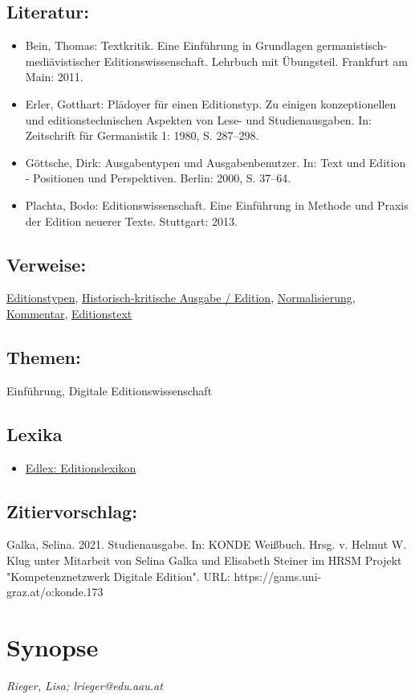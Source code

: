 \documentclass{article}
\begin{document}
        \subsection*{Literatur:}\begin{itemize}\item Bein, Thomas: Textkritik. Eine Einführung in Grundlagen germanistisch-mediävistischer Editionswissenschaft. Lehrbuch mit Übungsteil. Frankfurt am Main: 2011.\item Erler, Gotthart: Plädoyer für einen Editionstyp. Zu einigen konzeptionellen und editionstechnischen Aspekten von Lese- und Studienausgaben. In: Zeitschrift für Germanistik 1: 1980, S. 287–298.\item Göttsche, Dirk: Ausgabentypen und Ausgabenbenutzer. In: Text und Edition - Positionen und Perspektiven. Berlin: 2000, S. 37–64.\item Plachta, Bodo: Editionswissenschaft. Eine Einführung in Methode und Praxis der Edition neuerer Texte. Stuttgart: 2013.\end{itemize}\subsection*{Verweise:}\href{https://gams.uni-graz.at/o:konde.76}{Editionstypen}, \href{https://gams.uni-graz.at/o:konde.93}{Historisch-kritische Ausgabe / Edition}, \href{https://gams.uni-graz.at/o:konde.146}{Normalisierung}, \href{https://gams.uni-graz.at/o:konde.34}{Kommentar}, \href{https://gams.uni-graz.at/o:konde.75}{Editionstext}\subsection*{Themen:}Einführung, Digitale Editionswissenschaft\subsection*{Lexika}\begin{itemize}\item \href{https://edlex.de/index.php?title=Studienausgabe}{Edlex: Editionslexikon}\end{itemize}\subsection*{Zitiervorschlag:}Galka, Selina. 2021. Studienausgabe. In: KONDE Weißbuch. Hrsg. v. Helmut W. Klug unter Mitarbeit von Selina Galka und Elisabeth Steiner im HRSM Projekt "Kompetenznetzwerk Digitale Edition". URL: https://gams.uni-graz.at/o:konde.173\newpage\section*{Synopse} \emph{Rieger, Lisa; lrieger@edu.aau.at }\\
        
\end{document}
